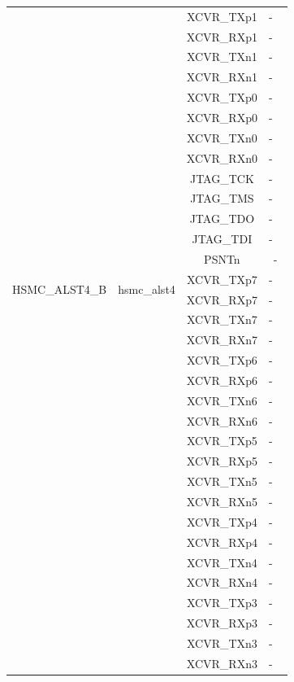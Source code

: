 \documentclass{article}
\begin{document}
\begin{longtable}[l]{|c|c|c|c|}
  & & XCVR\_TXp1 & - \
  \\\cline{3-4}
  & & XCVR\_RXp1 & - \
  \\\cline{3-4}
  & & XCVR\_TXn1 & - \
  \\\cline{3-4}
  & & XCVR\_RXn1 & - \
  \\\cline{3-4}
  & & XCVR\_TXp0 & - \
  \\\cline{3-4}
  & & XCVR\_RXp0 & - \
  \\\cline{3-4}
  & & XCVR\_TXn0 & - \
  \\\cline{3-4}
  & & XCVR\_RXn0 & - \
  \\\cline{3-4}
  & & JTAG\_TCK & - \
  \\\cline{3-4}
  & & JTAG\_TMS & - \
  \\\cline{3-4}
  & & JTAG\_TDO & - \
  \\\cline{3-4}
  & & JTAG\_TDI & - \
  \\\cline{3-4}
  & & PSNTn & - \\
	\hline
	\multirow{2}{*}{HSMC\_ALST4\_B} & \multirow{2}{*}{hsmc\_alst4} & XCVR\_TXp7 & - \
  \\\cline{3-4}
  & & XCVR\_RXp7 & - \
  \\\cline{3-4}
  & & XCVR\_TXn7 & - \
  \\\cline{3-4}
  & & XCVR\_RXn7 & - \
  \\\cline{3-4}
  & & XCVR\_TXp6 & - \
  \\\cline{3-4}
  & & XCVR\_RXp6 & - \
  \\\cline{3-4}
  & & XCVR\_TXn6 & - \
  \\\cline{3-4}
  & & XCVR\_RXn6 & - \
  \\\cline{3-4}
  & & XCVR\_TXp5 & - \
  \\\cline{3-4}
  & & XCVR\_RXp5 & - \
  \\\cline{3-4}
  & & XCVR\_TXn5 & - \
  \\\cline{3-4}
  & & XCVR\_RXn5 & - \
  \\\cline{3-4}
  & & XCVR\_TXp4 & - \
  \\\cline{3-4}
  & & XCVR\_RXp4 & - \
  \\\cline{3-4}
  & & XCVR\_TXn4 & - \
  \\\cline{3-4}
  & & XCVR\_RXn4 & - \
  \\\cline{3-4}
  & & XCVR\_TXp3 & - \
  \\\cline{3-4}
  & & XCVR\_RXp3 & - \
  \\\cline{3-4}
  & & XCVR\_TXn3 & - \
  \\\cline{3-4}
  & & XCVR\_RXn3 & - \
  \\\cline{3-4}

\end{longtable}
\end{document}
